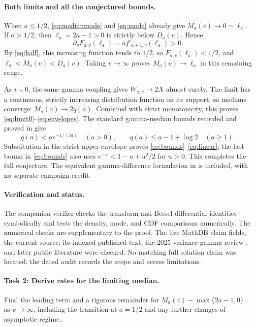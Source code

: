 \documentclass[11pt]{article}
\begin{document}
\paragraph{Both limits and all the conjectured bounds.}
When \(a\leq1/2\), \eqref{eq:medianmode} and \eqref{eq:mode} already
give \(M_a(v)\to0=\ell_a\). If \(a>1/2\), then
\(\ell_a=2a-1>0\) is strictly below \(D_a(v)\). Hence
\[
 \partial_v F_{a,v}(\ell_a)=a f'_{a+1,v}(\ell_a)>0.
\]
By \eqref{eq:half}, this increasing function tends to \(1/2\), so
\(F_{a,v}(\ell_a)<1/2\), and
\(\ell_a<M_a(v)<D_a(v)\). Taking \(v\to\infty\) proves
\(M_a(v)\to\ell_a\) in this remaining range.

As \(v\downarrow0\), the same gamma coupling gives
\(W_{a,v}\to2X\) almost surely. The limit has a continuous, strictly
increasing distribution function on its support, so medians converge:
\(M_a(v)\to2q(a)\). Combined with strict monotonicity, this proves
\eqref{eq:limit0}--\eqref{eq:envelopes}.
The standard gamma-median bounds recorded and proved in
\cite[Section 3]{GM} give
\[
 q(a)<a e^{-1/(3a)}\quad(a>0),\qquad
 q(a)\leq a-1+\log2\quad(a\geq1).
\]
Substitution in the strict upper envelope proves
\eqref{eq:bounds}--\eqref{eq:linear}; the last bound in
\eqref{eq:bounds} also uses \(e^{-u}<1-u+u^2/2\) for \(u>0\).
This completes the full conjecture. The equivalent gamma-difference
formulation in \cite[Conjecture 3.3]{GM} is included, with no separate
campaign credit.

\paragraph{Verification and status.}
The companion verifier checks the transform and Bessel differential
identities symbolically and tests the density, mode, and CDF comparisons
numerically. The numerical checks are supplementary to the proof.
The live MathDB claim fields, the current source, its indexed published
text, the 2025 variance-gamma review \cite{FGS}, and later public
literature were checked. No matching full solution claim was located;
the dated audit records the scope and access limitations.

\paragraph{Task 2: Derive rates for the limiting median.}
Find the leading term and a rigorous remainder for
\(M_a(v)-\max\{2a-1,0\}\) as \(v\to\infty\), including the transition
at \(a=1/2\) and any further changes of asymptotic regime.
\end{document}
